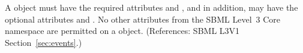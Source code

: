 A \Trigger object must have the required attributes
 and , and in addition, may have the
optional attributes   and .  No other
attributes from the SBML Level~3 Core namespace are permitted on a \Trigger
object.  (References: SBML L3V1 Section~\ref{sec:events}.)
